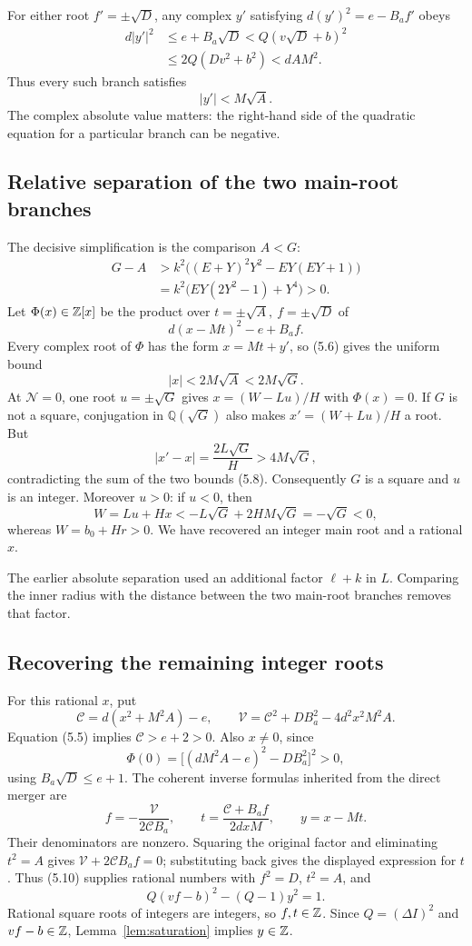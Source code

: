 For either root \(f'=\pm\sqrt D\), any complex \(y'\) satisfying
\(d(y')^2=e-B_af'\) obeys
\[
\begin{split}
d|y'|^2
&\le e+B_a\sqrt D
 <Q(v\sqrt D+b)^2\\
&\le2Q(Dv^2+b^2)<dAM^2.
\end{split}
\]
Thus every such branch satisfies
\[
|y'|<M\sqrt A.
\tag{5.6}
\]
The complex absolute value matters: the right-hand side of the
quadratic equation for a particular branch can be negative.

\subsection{Relative separation of the two main-root branches}

The decisive simplification is the comparison \(A<G\):
\[
\begin{split}
G-A
&>k^2\bigl((E+Y)^2Y^2-EY(EY+1)\bigr)\\
&=k^2\bigl(EY(2Y^2-1)+Y^4\bigr)>0.
\end{split}
\tag{5.7}
\]
Let \(\Phi(x)\in\mathbb Z[x]\) be the product over
\(t=\pm\sqrt A,\ f=\pm\sqrt D\) of
\[
d(x-Mt)^2-e+B_af.
\]
Every complex root of \(\Phi\) has the form \(x=Mt+y'\), so (5.6)
gives the uniform bound
\[
|x|<2M\sqrt A<2M\sqrt G.
\tag{5.8}
\]
At \(\mathcal N=0\), one root \(u=\pm\sqrt G\) gives
\(x=(W-Lu)/H\) with \(\Phi(x)=0\).
If \(G\) is not a square, conjugation in \(\mathbb Q(\sqrt G)\)
also makes \(x'=(W+Lu)/H\) a root. But
\[
|x'-x|=\frac{2L\sqrt G}{H}>4M\sqrt G,
\]
contradicting the sum of the two bounds (5.8).
Consequently \(G\) is a square and \(u\) is an integer.
Moreover \(u>0\): if \(u<0\), then
\[
W=Lu+Hx<-L\sqrt G+2HM\sqrt G=-\sqrt G<0,
\]
whereas \(W=b_0+Hr>0\).
We have recovered an integer main root and a rational \(x\).

The earlier absolute separation used an additional factor
\(\ell+k\) in \(L\). Comparing the inner radius with the distance
between the two main-root branches removes that factor.

\subsection{Recovering the remaining integer roots}

For this rational \(x\), put
\[
\mathcal C=d(x^2+M^2A)-e,\qquad
\mathcal V=\mathcal C^2+DB_a^2-4d^2x^2M^2A.
\tag{5.9}
\]
Equation (5.5) implies \(\mathcal C>e+2>0\).
Also \(x\ne0\), since
\[
\Phi(0)=\bigl[(dM^2A-e)^2-DB_a^2\bigr]^2>0,
\]
using \(B_a\sqrt D\le e+1\).
The coherent inverse formulas inherited from the direct merger are
\[
f=-\frac{\mathcal V}{2\mathcal C B_a},\qquad
t=\frac{\mathcal C+B_af}{2dxM},\qquad
y=x-Mt.
\tag{5.10}
\]
Their denominators are nonzero. Squaring the original factor and
eliminating \(t^2=A\) gives
\(\mathcal V+2\mathcal C B_af=0\); substituting back gives
the displayed expression for \(t\).
Thus (5.10) supplies rational numbers with
\(f^2=D\), \(t^2=A\), and
\[
Q(vf-b)^2-(Q-1)y^2=1.
\tag{5.11}
\]
Rational square roots of integers are integers, so \(f,t\in\mathbb Z\).
Since \(Q=(\Delta I)^2\) and \(vf-b\in\mathbb Z\),
Lemma~\ref{lem:saturation} implies \(y\in\mathbb Z\).

